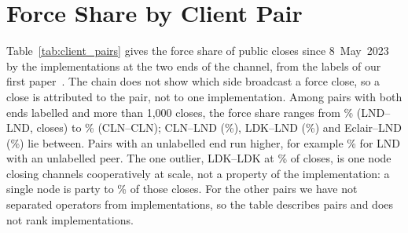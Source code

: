 \section{Force Share by Client Pair}
\label{app:pairs}



Table~\ref{tab:client_pairs} gives the force share of public closes since 8~May~2023 by the implementations at the
two ends of the channel, from the labels of our first paper~\cite{kumar2026clientdiversity}. The chain does not show
which side broadcast a force close, so a close is attributed to the pair, not to one implementation. Among pairs with
both ends labelled and more than 1,000 closes, the force share ranges from \PairForcePctLndLnd\% (LND--LND,
\PairClosesLndLnd{} closes) to \PairForcePctClnCln\% (CLN--CLN); CLN--LND (\PairForcePctClnLnd\%), LDK--LND
(\PairForcePctLdkLnd\%) and Eclair--LND (\PairForcePctEclairLnd\%) lie between. Pairs with an unlabelled end run higher,
for example \PairForcePctLndUnknown\% for LND with an unlabelled peer. The one outlier, LDK--LDK at
\PairForcePctLdkLdkExact\% of \PairClosesLdkLdk{} closes, is one node closing channels cooperatively at scale, not a
property of the implementation: a single node is party to \PairLdkLdkTopNodePct\% of those closes. For the other
pairs we have not separated operators from implementations, so the table describes pairs and does not rank
implementations.
